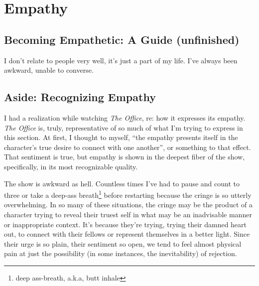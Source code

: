 \documentclass[../butidigress.tex]{subfiles}
\begin{document}
\chapter{Empathy}
\newpage



\section{Becoming Empathetic: A Guide (unfinished)}
I don't relate to people very well, it's just a part of my life.
I've always been awkward, unable to converse.

\section*{Aside: Recognizing Empathy}
I had a realization while watching \textit{The Office}, re: how it expresses its empathy.
\textit{The Office} is, truly, representative of so much of what I'm trying to express in this section.
At first, I thought to myself, ``the empathy presents itself in the character's true desire to connect with one another'', or something to that effect.
That sentiment is true, but empathy is shown in the deepest fiber of the show, specifically, in its most recognizable quality.

The show is awkward as hell.
Countless times I've had to pause and count to three or take a deep-ass breath\footnote{deep ass-breath, a.k.a, butt inhale} before restarting because the cringe is so utterly overwhelming.
In so many of these situations, the cringe may be the product of a character trying to reveal their truest self in what may be an inadvisable manner or inappropriate context.
It's because they're trying, trying their damned heart out, to connect with their fellows or represent themselves in a better light.
Since their urge is so plain, their sentiment so open, we tend to feel almost physical pain at just the possibility (in some instances, the inevitability) of rejection.
\end{document}
